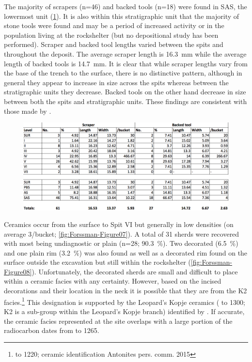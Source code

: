   The majority of scrapers (n=46) and backed tools (n=18) were found in SAS, the lowermost unit (\cref{fig:Forssman-Table04}). 
  It is also within this stratigraphic unit that the majority of stone tools were found and may be a period of increased activity or in the population living at the rockshelter (but no depositional study has been performed). Scraper and backed tool lengths varied between the spits and throughout the deposit. The average scraper length is \SI{16.3}{\milli\meter} 
   while the average length of backed tools is \SI{14.7}{\milli\meter}. 
  It is clear that while scraper lengths vary from the base of the trench to the surface, there is no distinctive pattern, 
   although in general they appear to increase in size across the spits whereas between the stratigraphic units they decrease. Backed tools on the other hand decrease in size between both the spits and stratigraphic units. These findings are consistent with those made by \textcite[31]{Walker_1994}.
   
   	\begin{figure} %
   		\includegraphics[width=.8\linewidth]{figures/Forssman-Table04}
   		\centering
   		\label{fig:Forssman-Table04}
   	\end{figure}
   

Ceramics occur from the  surface to Spit VI but generally in low densities (on average 3/bucket; \cref{fig:Forssman-Figure07}). 
A total of 31 sherds were recovered with most being undiagnostic or plain 
(n=28; \SI{90.3}{\percent}). 
Two decorated (\SI{6.5}{\percent}) and one plain rim (\SI{3.2}{\percent}) was also found as well as a decorated rim found on the surface outside the excavation but still within the rockshelter (\cref{fig:Forssman-Figure08}). 
Unfortunately, the decorated sherds are small and difficult to place within a ceramic facies with any certainty. However, based on the incised decorations and their location in the neck it is possible that they are from the K2 facies.\footnote{ to 1220; ceramic identification Antonites pers. comm. 2015} 
This designation is supported by the Leopard’s Kopje ceramics ( to 1300; K2 is a sub-group within the Leopard’s Kopje branch) identified by \textcite{Walker_1994}. 
If accurate, the ceramic facies represented at the site overlaps with a large portion of the radiocarbon dates from  to 1265.

